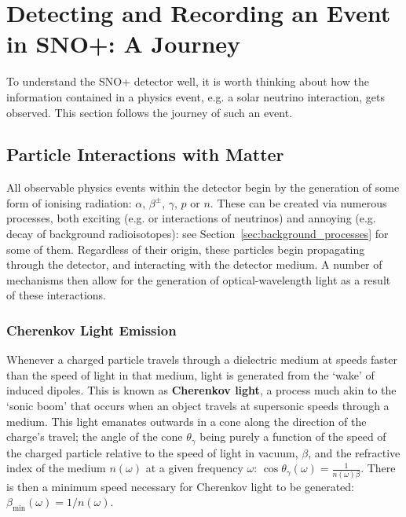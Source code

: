 \section{Detecting and Recording an Event in SNO+: A Journey}\label{sec:event_journey}
To understand the SNO+ detector well, it is worth thinking about how the information contained in a physics event, e.g. a solar neutrino interaction, gets observed. This section follows the journey of such an event.
\subsection{Particle Interactions with Matter}\label{sec:interactions_w_matter}
All observable physics events within the detector begin by the generation of some form of ionising radiation: $\alpha$, $\beta^{\pm}$, $\gamma$, $p$ or $n$. These can be created via numerous processes, both exciting (e.g. \onbb{} or interactions of neutrinos) and annoying (e.g. decay of background radioisotopes): see Section~\ref{sec:background_processes} for some of them. Regardless of their origin, these particles begin propagating through the detector, and interacting with the detector medium. A number of mechanisms then allow for the generation of optical-wavelength light as a result of these interactions.
\subsubsection{Cherenkov Light Emission}
Whenever a charged particle travels through a dielectric medium at speeds faster than the speed of light in that medium, light is generated from the `wake' of induced dipoles. This is known as \textbf{Cherenkov light}, a process much akin to the `sonic boom' that occurs when an object travels at supersonic speeds through a medium. This light emanates outwards in a cone along the direction of the charge's travel; the angle of the cone $\theta_{\gamma}$ being purely a function of the speed of the charged particle relative to the speed of light in vacuum, $\beta$, and the refractive index of the medium $n(\omega)$ at a given frequency $\omega$: $\cos{\theta_{\gamma}}(\omega) = \frac{1}{n(\omega)\beta}$. There is then a minimum speed necessary for Cherenkov light to be generated: $\beta_{\textrm{min}}(\omega) = 1/n(\omega)$.

